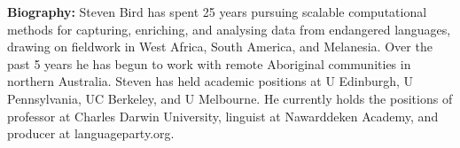 \vspace{3em}\par

\vfill
\noindent

{\bfseries Biography:}
Steven Bird has spent 25 years pursuing scalable computational methods for capturing, enriching, and analysing data from endangered languages, drawing on fieldwork in West Africa, South America, and Melanesia. Over the past 5 years he has begun to work with remote Aboriginal communities in northern Australia. Steven has held academic positions at U Edinburgh, U Pennsylvania, UC Berkeley, and U Melbourne. He currently holds the positions of professor at Charles Darwin University, linguist at Nawarddeken Academy, and producer at languageparty.org.

\newpage
